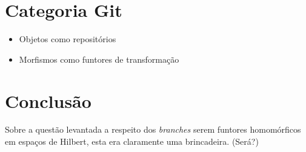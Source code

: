 \documentclass[a4paper]{article}
\begin{document}
\section*{Categoria Git}
\begin{itemize}
\item Objetos como repositórios
\item Morfismos como funtores de transformação
\end{itemize}

\section*{Conclusão}

Sobre a questão levantada a respeito dos {\it branches} serem funtores homomórficos em espaços de Hilbert, esta era claramente uma brincadeira. (Será?)
{}
\end{document}
